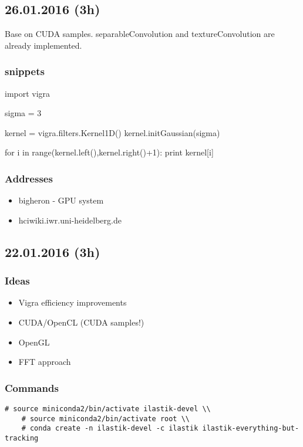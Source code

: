 \documentclass[12pt,a4paper]{article}
\begin{document}
\subsection{26.01.2016 (3h)}

  Base on CUDA samples. separableConvolution and textureConvolution are already implemented.

  \subsubsection{snippets}
    \begin{python}[caption="print out gaussian 1D kernel"]
      import vigra

      sigma = 3

      kernel = vigra.filters.Kernel1D()
      kernel.initGaussian(sigma)
      
      for i in range(kernel.left(),kernel.right()+1):
	print kernel[i]
    \end{python}

  \subsubsection{Addresses}
    \begin{itemize}
      \item bigheron - GPU system
      \item hciwiki.iwr.uni-heidelberg.de
    \end{itemize}


\subsection{22.01.2016 (3h)}

  \subsubsection{Ideas}
    \begin{itemize}
      \item Vigra efficiency improvements
      \item CUDA/OpenCL (CUDA samples!)
      \item OpenGL
      \item FFT approach
    \end{itemize}

  \subsubsection{Commands}

    \begin{lstlisting}[style=BashInputStyle]
    # source miniconda2/bin/activate ilastik-devel \\
    # source miniconda2/bin/activate root \\
    # conda create -n ilastik-devel -c ilastik ilastik-everything-but-tracking
    \end{lstlisting}
\end{document}
